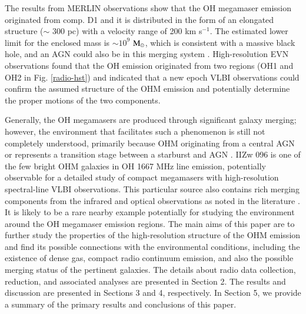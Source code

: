 \documentclass[]{aa} %
\newcommand{\kms}{km s$^{-1}$\xspace}
\begin{document}
 The results from MERLIN observations show that the OH megamaser emission originated from comp. D1 and it is distributed in the form of an elongated structure ($\sim$ 300 pc) with a velocity range of 200 \kms \citep{2011MNRAS.416.1267M}. The estimated lower limit for the enclosed mass is $\sim 10^{9}$ $\rm M_{\odot}$, which is consistent with a massive black hole, and an AGN could also be in this merging system \citep{2011MNRAS.416.1267M}. High-resolution EVN observations \citep{2010PhDT.......280C} found that the OH emission originated from two regions (OH1 and OH2 in Fig. \ref{radio-hst}) and indicated that a new epoch VLBI observations could confirm the assumed structure of the OHM emission and potentially determine the proper motions of the two components.


Generally,  the OH megamasers are produced through significant galaxy merging; however, the environment that facilitates such a phenomenon is still not completely understood, primarily because OHM originating from a central AGN or represents a transition stage between a starburst and AGN  \citep{2018MNRAS.474.5319H}. IIZw 096 is one of the few bright OHM galaxies in OH 1667 MHz line emission, potentially observable for a detailed study of compact megamasers with high-resolution spectral-line VLBI observations. This particular source also contains rich merging components from the infrared and optical observations as noted in the literature \citep[e.g.][]{1997AJ....113.1569G,2010AJ....140...63I,2011MNRAS.416.1267M}. It is likely to be a rare nearby example potentially for studying the environment around the OH megamaser emission regions. The main aims of this paper are to further study the properties of the high-resolution structure of the OHM emission \citep{2010PhDT.......280C}  and find its possible connections with the environmental conditions, including the existence of dense gas, compact radio continuum emission, and also the possible merging status of the pertinent galaxies. The details about radio data collection, reduction, and associated analyses are presented in Section 2. The results and discussion are presented in Sections 3 and 4, respectively. In Section 5, we provide a summary of the primary results and conclusions of this paper.

\end{document}
